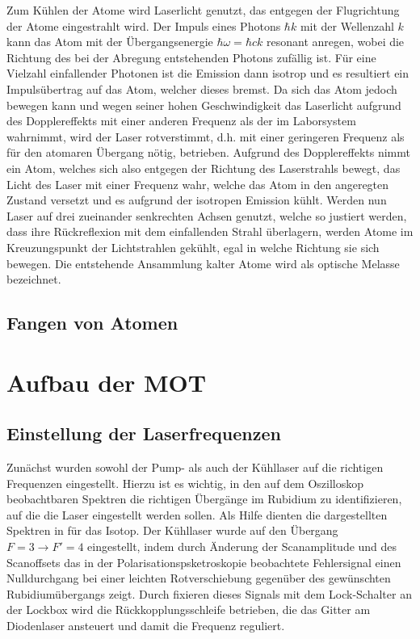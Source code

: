 \documentclass[11pt, a4paper]{article}
\numberwithin{equation}{section}
\begin{document}
Zum Kühlen der Atome wird Laserlicht genutzt, das entgegen der Flugrichtung der Atome eingestrahlt wird.
Der Impuls eines Photons $\hbar k$ mit der Wellenzahl $k$ kann das Atom mit der Übergangsenergie $\hbar\omega = \hbar c k$ resonant anregen, wobei die Richtung des bei der Abregung entstehenden Photons zufällig ist.
Für eine Vielzahl einfallender Photonen ist die Emission dann isotrop und es resultiert ein Impulsübertrag auf das Atom, welcher dieses bremst.
Da sich das Atom jedoch bewegen kann und wegen seiner hohen Geschwindigkeit das Laserlicht aufgrund des Dopplereffekts mit einer anderen Frequenz als der im Laborsystem wahrnimmt, wird der Laser rotverstimmt, d.h. mit einer geringeren Frequenz als für den atomaren Übergang nötig, betrieben.
Aufgrund des Dopplereffekts nimmt ein Atom, welches sich also entgegen der Richtung des Laserstrahls bewegt, das Licht des Laser mit einer Frequenz wahr, welche das Atom in den angeregten Zustand versetzt und es aufgrund der isotropen Emission kühlt.
Werden nun Laser auf drei zueinander senkrechten Achsen genutzt, welche so justiert werden, dass ihre Rückreflexion mit dem einfallenden Strahl überlagern, werden Atome im Kreuzungspunkt der Lichtstrahlen gekühlt, egal in welche Richtung sie sich bewegen.
Die entstehende Ansammlung kalter Atome wird als optische Melasse bezeichnet. 

\subsection{Fangen von Atomen}



\section{Aufbau der MOT}

\subsection{Einstellung der Laserfrequenzen}

Zunächst wurden sowohl der Pump- als auch der Kühllaser auf die richtigen Frequenzen eingestellt.
Hierzu ist es wichtig, in den auf dem Oszilloskop beobachtbaren Spektren die richtigen Übergänge im Rubidium zu identifizieren, auf die die Laser eingestellt werden sollen.
Als Hilfe dienten die dargestellten Spektren in \cite{anleitung} für das  Isotop.
Der Kühllaser wurde auf den Übergang $F=3 \rightarrow F\prime=4$ eingestellt, indem durch Änderung der Scanamplitude und des Scanoffsets das in der Polarisationspsketroskopie beobachtete Fehlersignal einen Nulldurchgang bei einer leichten Rotverschiebung gegenüber des gewünschten Rubidiumübergangs zeigt.
Durch fixieren dieses Signals mit dem Lock-Schalter an der Lockbox wird die Rückkopplungsschleife betrieben, die das Gitter am Diodenlaser ansteuert und damit die Frequenz reguliert.
\end{document}
